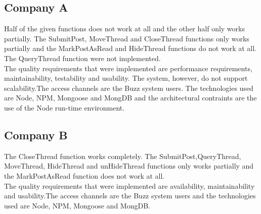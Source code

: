 \subsection{Company A}
\begin{flushleft}
Half of the given functions does not work at all and the other half only works partially. The SubmitPost, MoveThread and CloseThread functions only works partially and the MarkPostAsRead and HideThread  functions do not work at all. The QueryThread function were not implemented. \\

The quality requirements that were implemented are performance requirements, maintainability, testability and usability. The system, however, do not support scalability.The access channels are the Buzz system users. The technologies used are Node, NPM, Mongoose and MongDB and the architectural contraints are the use of the Node run-time environment.


\end{flushleft}

\subsection{Company B}
\begin{flushleft}
The CloseThread function works completely. The SubmitPost,QueryThread, MoveThread, HideThread and unHideThread functions only works partially and the MarkPostAsRead function does not work at all.   \\

The quality requirements that were implemented are availability, maintainability and usability.The access channels are the Buzz system users and the technologies used are Node, NPM, Mongoose and MongDB.
\end{flushleft}

